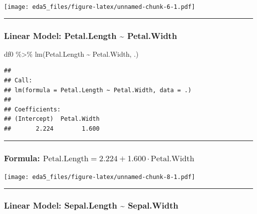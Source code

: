\documentclass[
]{article}
\newenvironment{Shaded}{\begin{snugshade}}{\end{snugshade}}
\newcommand{\FunctionTok}[1]{\textcolor[rgb]{0.00,0.00,0.00}{#1}}
\newcommand{\NormalTok}[1]{#1}
\newcommand{\SpecialCharTok}[1]{\textcolor[rgb]{0.00,0.00,0.00}{#1}}
\begin{document}
\texttt{[image: eda5\_files/figure-latex/unnamed-chunk-6-1.pdf]}

\begin{center}\rule{0.5\linewidth}{0.5pt}\end{center}

\hypertarget{linear-model-petal.length-petal.width}{%
\subsubsection{Linear Model: Petal.Length \textasciitilde{}
Petal.Width}\label{linear-model-petal.length-petal.width}}

\begin{Shaded}
\begin{Highlighting}[]
\NormalTok{df0 }\SpecialCharTok{\%\textgreater{}\%} \FunctionTok{lm}\NormalTok{(Petal.Length }\SpecialCharTok{\textasciitilde{}}\NormalTok{ Petal.Width, .)}
\end{Highlighting}
\end{Shaded}

\begin{verbatim}
## 
## Call:
## lm(formula = Petal.Length ~ Petal.Width, data = .)
## 
## Coefficients:
## (Intercept)  Petal.Width  
##       2.224        1.600
\end{verbatim}

\begin{center}\rule{0.5\linewidth}{0.5pt}\end{center}

\hypertarget{formula-textpetal.length-2.224-1.600cdot-textpetal.width}{%
\subsubsection{\texorpdfstring{Formula:
\(\text{Petal.Length} = 2.224 + 1.600\cdot \text{Petal.Width}\)}{Formula: \textbackslash text\{Petal.Length\} = 2.224 + 1.600\textbackslash cdot \textbackslash text\{Petal.Width\}}}\label{formula-textpetal.length-2.224-1.600cdot-textpetal.width}}

\texttt{[image: eda5\_files/figure-latex/unnamed-chunk-8-1.pdf]}

\begin{center}\rule{0.5\linewidth}{0.5pt}\end{center}

\hypertarget{linear-model-sepal.length-sepal.width}{%
\subsubsection{Linear Model: Sepal.Length \textasciitilde{}
Sepal.Width}\label{linear-model-sepal.length-sepal.width}}
\end{document}
